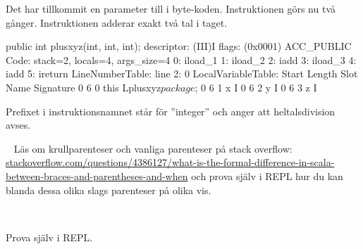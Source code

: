 \SubtaskSolved Det har tillkommit en parameter till i byte-koden. Instruktionen  görs nu två gånger. Instruktionen  adderar exakt två tal i taget.

\begin{REPL}
public int plusxyz(int, int, int);
  descriptor: (III)I
  flags: (0x0001) ACC_PUBLIC
  Code:
    stack=2, locals=4, args_size=4
       0: iload_1
       1: iload_2
       2: iadd
       3: iload_3
       4: iadd
       5: ireturn
    LineNumberTable:
      line 2: 0
    LocalVariableTable:
      Start  Length  Slot  Name   Signature
          0       6     0  this   Lplusxyz$package$;
          0       6     1     x   I
          0       6     2     y   I
          0       6     3     z   I
\end{REPL}


\SubtaskSolved Prefixet  i instruktionsnamnet  står för ''integer'' och anger att heltalsdivision avses.

\QUESTEND





\QUESTBEGIN

\Task  \what~ Läs om krullparenteser och vanliga parenteser på stack overflow: \\ \href{http://stackoverflow.com/questions/4386127/what-is-the-formal-difference-in-scala-between-braces-and-parentheses-and-when}{stackoverflow.com/questions/4386127/what-is-the-formal-difference-in-scala-between-braces-and-parentheses-and-when} och prova själv i REPL hur du kan blanda dessa olika slags parenteser på olika vis.

\SOLUTION

\TaskSolved \what~

\SubtaskSolved Prova själv i REPL.

\QUESTEND
